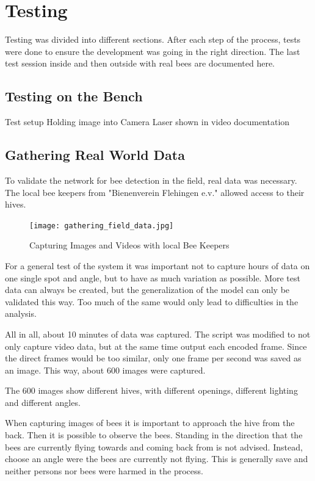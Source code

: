 \documentclass[a4paper,titlepage]{article}
\begin{document}
\newpage
\section{Testing}

Testing was divided into different sections.
After each step of the process, tests were done to ensure the development was going in the right direction.
The last test session inside and then outside with real bees are documented here.

\subsection{Testing on the Bench}

Test setup
Holding image into Camera
Laser shown in video documentation

\subsection{Gathering Real World Data}

To validate the network for bee detection in the field, real data was necessary.
The local bee keepers from "Bienenverein Flehingen e.v." allowed access to their hives.

\begin{figure}[H]
    \texttt{[image: gathering\_field\_data.jpg]}
    \caption{Capturing Images and Videos with local Bee Keepers}
\end{figure}

For a general test of the system it was important not to capture hours of data on one single spot and angle, but to have as much variation as possible.
More test data can always be created, but the generalization of the model can only be validated this way.
Too much of the same would only lead to difficulties in the analysis.

All in all, about 10 minutes of data was captured.
The script was modified to not only capture video data, but at the same time output each encoded frame.
Since the direct frames would be too similar, only one frame per second was saved as an image.
This way, about 600 images were captured.

The 600 images show different hives, with different openings, different lighting and different angles.

When capturing images of bees it is important to approach the hive from the back.
Then it is possible to observe the bees.
Standing in the direction that the bees are currently flying towards and coming back from is not advised.
Instead, choose an angle were the bees are currently not flying.
This is generally save and neither persons nor bees were harmed in the process.
\end{document}
